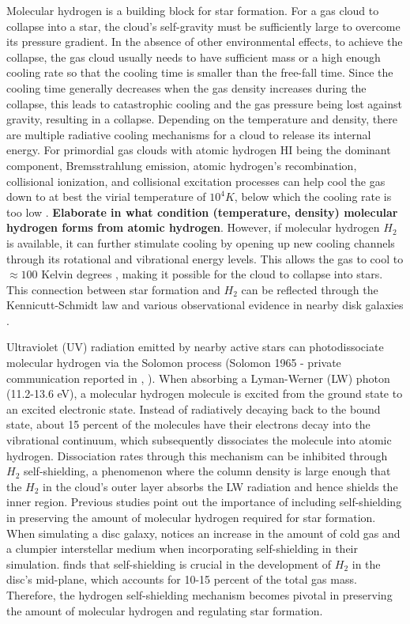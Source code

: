 \documentclass[linenumbers, twocolumn]{aastex631}
\begin{document}
Molecular hydrogen is a building block for star formation. For a gas cloud to collapse into a star, the cloud's self-gravity must be sufficiently large to overcome its pressure gradient. In the absence of other environmental effects, to achieve the collapse, the gas cloud usually needs to have sufficient mass or a high enough cooling rate so that the cooling time is smaller than the free-fall time. Since the cooling time generally decreases when the gas density increases during the collapse, this leads to catastrophic cooling and the gas pressure being lost against gravity, resulting in a collapse. Depending on the temperature and density, there are multiple radiative cooling mechanisms for a cloud to release its internal energy. For primordial gas clouds with atomic hydrogen HI being the dominant component, Bremsstrahlung emission, atomic hydrogen's recombination, collisional ionization, and collisional excitation processes can help cool the gas down to at best the virial temperature of $10^{4} K$, below which the cooling rate is too low \citep{Thoul+1995}. \textbf{Elaborate in what condition (temperature, density) molecular hydrogen forms from atomic hydrogen}. However, if molecular hydrogen $H_{2}$ is available, it can further stimulate cooling by opening up new cooling channels through its rotational and vibrational energy levels. This allows the gas to cool to $\approx 100$ Kelvin degrees \citep{Galli+1998}, making it possible for the cloud to collapse into stars. This connection between star formation and $H_{2}$ can be reflected through the Kennicutt-Schmidt law \citep{Schmidt+1959, Kennicutt+1998} and various observational evidence in nearby disk galaxies \citep{Wong+2002, Kennicutt+2007, Leroy+2013}. 

Ultraviolet (UV) radiation emitted by nearby active stars can photodissociate molecular hydrogen via the Solomon process (Solomon 1965 - private communication reported in \citealt{Field+1966}, \citealt{Stecher+1967}). When absorbing a Lyman-Werner (LW) photon (11.2-13.6 eV), a molecular hydrogen molecule is excited from the ground state to an excited electronic state. Instead of radiatively decaying back to the bound state, about 15 percent of the molecules have their electrons decay into the vibrational continuum, which subsequently dissociates the molecule into atomic hydrogen. Dissociation rates through this mechanism can be inhibited through $H_2$ self-shielding, a phenomenon where the column density is large enough that the $H_{2}$ in the cloud's outer layer absorbs the LW radiation and hence shields the inner region. Previous studies point out the importance of including self-shielding in preserving the amount of molecular hydrogen required for star formation. When simulating a disc galaxy, \citep{Christensen+2012} notices an increase in the amount of cold gas and a clumpier interstellar medium when incorporating self-shielding in their simulation. \cite{Safranek-Shrader+2017} finds that self-shielding is crucial in the development of $H_{2}$ in the disc's mid-plane, which accounts for 10-15 percent of the total gas mass. Therefore, the hydrogen self-shielding mechanism becomes pivotal in preserving the amount of molecular hydrogen and regulating star formation. 
\end{document}
